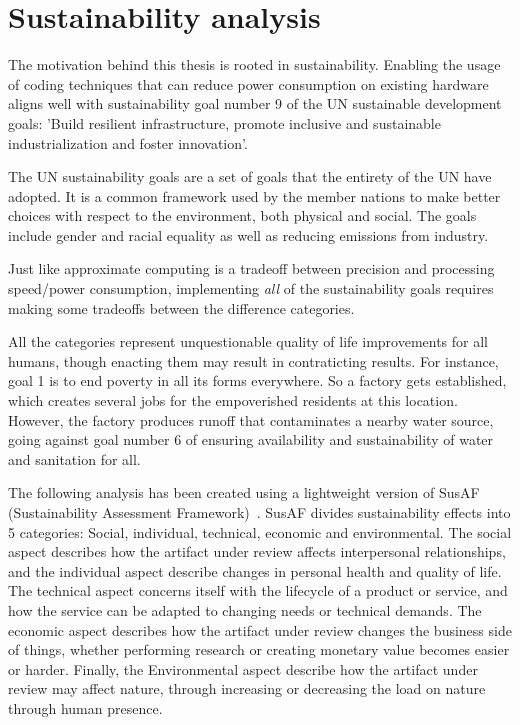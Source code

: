 \section{Sustainability analysis}
The motivation behind this thesis is rooted in sustainability. Enabling the usage of coding techniques that can reduce power consumption on existing hardware aligns well with sustainability goal number 9 of the UN sustainable development goals: 'Build resilient infrastructure, promote inclusive and sustainable industrialization and foster innovation'. 

The UN sustainability goals are a set of goals that the entirety of the UN have adopted. It is a common framework used by the member nations to make better choices with respect to the environment, both physical and social. The goals include gender and racial equality as well as reducing emissions from industry.

Just like approximate computing is a tradeoff between precision and processing speed/power consumption, implementing \emph{all} of the sustainability goals requires making some tradeoffs between the difference categories. 

All the categories represent unquestionable quality of life improvements for all humans, though enacting them may result in contraticting results. For instance, goal 1 is to end poverty in all its forms everywhere. So a factory gets established, which creates several jobs for the empoverished residents at this location. However, the factory produces runoff that contaminates a nearby water source, going against goal number 6 of ensuring availability and sustainability of water and sanitation for all. 

The following analysis has been created using a lightweight version of SusAF (Sustainability Assessment Framework)~\cite{SusAF_website}. SusAF divides sustainability effects into 5 categories: Social, individual, technical, economic and environmental. The social aspect describes how the artifact under review affects interpersonal relationships, and the individual aspect describe changes in personal health and quality of life. The technical aspect concerns itself with the lifecycle of a product or service, and how the service can be adapted to changing needs or technical demands. The economic aspect describes how the artifact under review changes the business side of things, whether performing research or creating monetary value becomes easier or harder. Finally, the Environmental aspect describe how the artifact under review may affect nature, through increasing or decreasing the load on nature through human presence.

